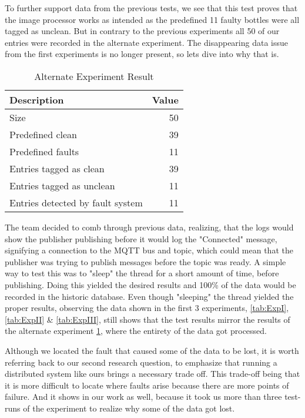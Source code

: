 To further support data from the previous tests, we see that this test proves that the image processor works as intended as the predefined 11 faulty bottles were all tagged as unclean. But in contrary to the previous experiments all 50 of our entries were recorded in the alternate experiment. The disappearing data issue from the first experiments is no longer present, so lets dive into why that is.
\begin{table}[h]
    \centering
    \caption{Alternate Experiment Result}
    \begin{tabular}{lr}
        \toprule
        \textbf{Description} & \textbf{Value} \\
        \midrule
        Size & 50 \\
        \hline
        Predefined clean & 39 \\
        Predefined faults & 11 \\
        \hline
        Entries tagged as clean & 39 \\
        Entries tagged as unclean & 11 \\
        Entries detected by fault system & 11
        \bottomrule
    \end{tabular}
    \label{tab:AltExp}
\end{table}

The team decided to comb through previous data, realizing, that the logs would show the publisher publishing before it would log the "Connected" message, signifying a connection to the MQTT bus and topic, which could mean that the publisher was trying to publish messages before the topic was ready. A simple way to test this was to "sleep" the thread for a short amount of time, before publishing. Doing this yielded the desired results and 100\% of the data would be recorded in the historic database. Even though "sleeping" the thread yielded the proper results, observing the data shown in the first 3 experiments, \ref{tab:ExpI}, \ref{tab:ExpII} \& \ref{tab:ExpIII}, still shows that the test results mirror the results of the alternate experiment \ref{tab:AltExp}, where the entirety of the data got processed.

Although we located the fault that caused some of the data to be lost, it is worth referring back to our second research question, to emphasize that running a distributed system like ours brings a necessary trade off. This trade-off being that it is more difficult to locate where faults arise because there are more points of failure. And it shows in our work as well, because it took us more than three test-runs of the experiment to realize why some of the data got lost.